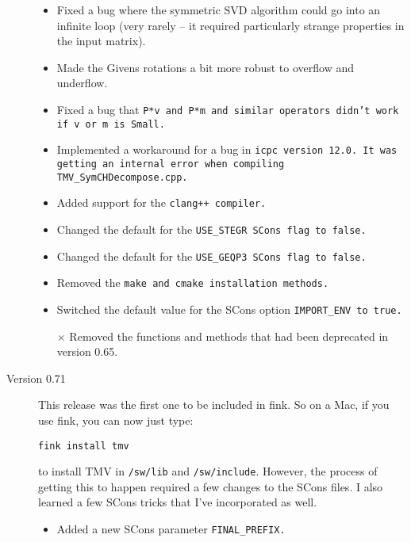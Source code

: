 \begin{description}
\begin{itemize}
\item
Fixed a bug where the symmetric SVD algorithm could go into an infinite loop (very rarely -- it required particularly strange properties in the input matrix).
 
\item
Made the Givens rotations a bit more robust to overflow and underflow.

\item
Fixed a bug that \tt{P*v} and \tt{P*m} and similar operators didn't work if 
\tt{v} or \tt{m} is \tt{Small}.

\item
Implemented a workaround for a bug in \tt{icpc} version 12.0.
It was getting an internal
error when compiling \tt{TMV\_SymCHDecompose.cpp}.  

\item 
Added support for the \tt{clang++} compiler.  

\item
Changed the default for the \tt{USE\_STEGR} SCons flag to \tt{false}.  

\item
Changed the default for the \tt{USE\_GEQP3} SCons flag to \tt{false}.

\item
Removed the \tt{make} and \tt{cmake} installation methods.  

\item
Switched the default value for the SCons option \tt{IMPORT\_ENV} to \tt{true}.

\item[$\times$]
Removed the functions and methods that had been deprecated in version 0.65.

\end{itemize}

\item[Version 0.71]

This release was the first one to be included in fink.
So on a Mac, if you use fink, you can now just type: 
\begin{verbatim}
fink install tmv
\end{verbatim}
to install TMV in \texttt{/sw/lib} and \texttt{/sw/include}.
However, the process of getting this to happen required a few changes to the SCons files.
I also learned a few SCons tricks that I've incorporated as well.

\begin{itemize}

\item
Added a new SCons parameter \tt{FINAL\_PREFIX}.


\end{itemize}
\end{description}
